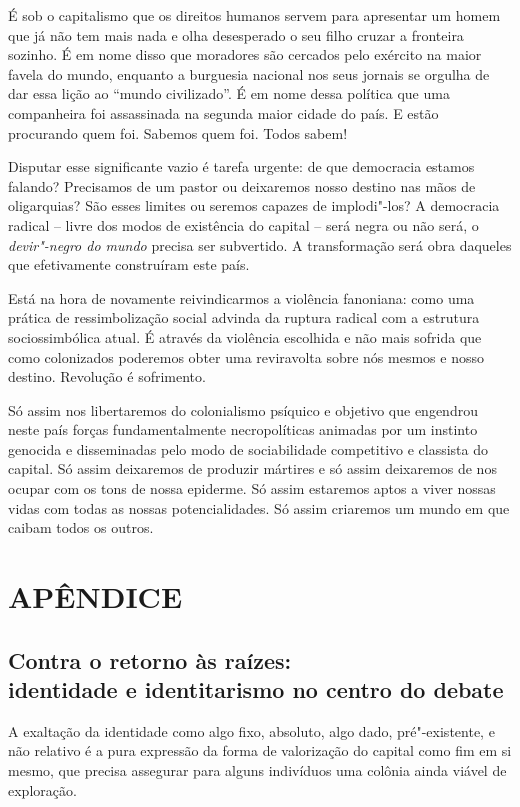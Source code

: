 É sob o capitalismo que os direitos humanos servem para apresentar um
homem que já não tem mais nada e olha desesperado o seu filho cruzar a
fronteira sozinho. É em nome disso que moradores são cercados pelo
exército na maior favela do mundo, enquanto a burguesia nacional nos
seus jornais se orgulha de dar essa lição ao ``mundo civilizado''. É em
nome dessa política que uma companheira foi assassinada na segunda maior
cidade do país. E estão procurando quem foi. Sabemos quem foi. Todos
sabem!

Disputar esse significante vazio é tarefa urgente: de que democracia
estamos falando? Precisamos de um pastor ou deixaremos nosso destino nas
mãos de oligarquias? São esses limites ou seremos capazes de
implodi"-los? A democracia radical -- livre dos modos de existência do
capital -- será negra ou não será, o \emph{devir"-negro do mundo} precisa
ser subvertido. A transformação será obra daqueles que efetivamente
construíram este país.

Está na hora de novamente reivindicarmos a violência fanoniana: como uma
prática de ressimbolização social advinda da ruptura radical com a
estrutura sociossimbólica atual. É através da violência escolhida e não
mais sofrida que como colonizados poderemos obter uma reviravolta sobre
nós mesmos e nosso destino. Revolução é sofrimento.

Só assim nos libertaremos do colonialismo psíquico e objetivo que
engendrou neste país forças fundamentalmente necropolíticas animadas por
um instinto genocida e disseminadas pelo modo de sociabilidade
competitivo e classista do capital. Só assim deixaremos de produzir
mártires e só assim deixaremos de nos ocupar com os tons de nossa
epiderme. Só assim estaremos aptos a viver nossas vidas com todas as
nossas potencialidades. Só assim criaremos um mundo em que caibam todos
os outros.

\part{APÊNDICE}

\chapter{Contra o retorno às raízes:\\ identidade e identitarismo no centro do debate}

A exaltação da identidade como algo
fixo, absoluto, algo dado,
pré"-existente, e não relativo é a pura expressão da forma de valorização
do capital como fim em si mesmo, que precisa assegurar para alguns
indivíduos uma colônia ainda viável de exploração.

